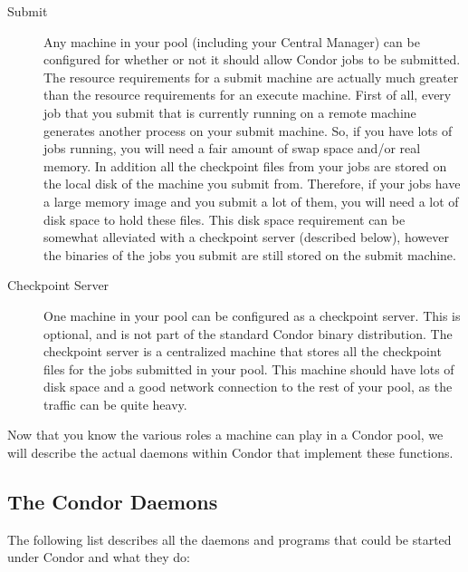 \begin{description}
\item[Submit] Any machine in your pool (including your Central
Manager) can be configured for whether or not it should allow Condor
jobs to be submitted.
The resource requirements for a submit machine
are actually much greater than the resource requirements for an
execute machine.  First of all, every job that you submit that is
currently running on a remote machine generates another process on
your submit machine.  So, if you have lots of jobs running, you will
need a fair amount of swap space and/or real memory.  In addition all
the checkpoint files from your jobs are stored on the local disk of
the machine you submit from.  Therefore, if your jobs have a large
memory image and you submit a lot of them, you will need a lot of disk
space to hold these files.  This disk space requirement can be
somewhat alleviated with a checkpoint server (described below),
however the binaries of the jobs you submit are still stored on the
submit machine.

\item[Checkpoint Server] One machine in your pool can be configured as
a checkpoint server.
This is optional, and is not part of the
standard Condor binary distribution.  The checkpoint server is a
centralized machine that stores all the checkpoint files for the jobs
submitted in your pool.  This machine should have lots of disk space
and a good network connection to the rest of your pool, as the traffic
can be quite heavy.

\end{description}

Now that you know the various roles a machine can play in a Condor
pool, we will describe the actual daemons within Condor that implement
these functions.

\subsection{\label{sec:Condor-Daemons}The Condor Daemons}

The following list describes all the daemons and programs that could
be started under Condor and what they do:

